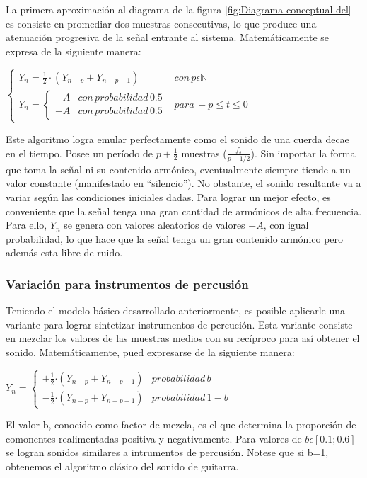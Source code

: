 \documentclass[../ASSD_TP2.tex]{subfiles}
\begin{document}
La primera aproximación al diagrama de la figura \ref{fig:Diagrama-conceptual-del}
es consiste en promediar dos muestras consecutivas, lo que produce
una atenuación progresiva de la señal entrante al sistema. Matemáticamente
se expresa de la siguiente manera: 
\begin{center}
$\begin{cases}
Y_{n}=\frac{1}{2}\cdot(Y_{n-p}+Y_{n-p-1}) & con\,p\epsilon\mathbb{N}\\
Y_{n}=\begin{cases}
+A & con\,probabilidad\,0.5\\
-A & con\,probabilidad\,0.5
\end{cases} & para\,-p\leq t\leq0
\end{cases}$
\par\end{center}

Este algoritmo logra emular perfectamente como el sonido de una cuerda
decae en el tiempo. Posee un período de $p+\frac{1}{2}$ muestras
($\frac{f_{s}}{p+1/2}$). Sin importar la forma que toma la señal
ni su contenido armónico, eventualmente siempre tiende a un valor
constante (manifestado en ``silencio''). No obstante, el sonido
resultante va a variar según las condiciones iniciales dadas. Para
lograr un mejor efecto, es conveniente que la señal tenga una gran
cantidad de armónicos de alta frecuencia. Para ello, $Y_{n}$ se genera
con valores aleatorios de valores $\pm A$, con igual probabilidad,
lo que hace que la señal tenga un gran contenido armónico pero además
esta libre de ruido.

\subsubsection{Variación para instrumentos de percusión}

Teniendo el modelo básico desarrollado anteriormente, es posible aplicarle
una variante para lograr sintetizar instrumentos de percución. Esta
variante consiste en mezclar los valores de las muestras medios con
su recíproco para así obtener el sonido. Matemáticamente, pued expresarse
de la siguiente manera:

$Y_{n}=\begin{cases}
+\frac{1}{2}\text{·}(Y_{n-p}+Y_{n-p-1}) & probabilidad\,b\\
-\frac{1}{2}\text{·}(Y_{n-p}+Y_{n-p-1}) & probabilidad\,1-b
\end{cases}$

El valor b, conocido como factor de mezcla, es el que determina la
proporción de comonentes realimentadas positiva y negativamente. Para
valores de $b\epsilon[0.1;0.6]$ se logran sonidos similares a intrumentos
de percusión. Notese que si b=1, obtenemos el algoritmo clásico del
sonido de guitarra.
\end{document}
